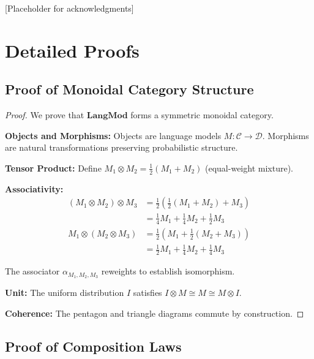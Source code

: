 \documentclass{article}
\theoremstyle{definition}
\begin{document}
[Placeholder for acknowledgments]




\appendix

\section{Detailed Proofs}

\subsection{Proof of Monoidal Category Structure}

\begin{proof}
We prove that $\mathbf{LangMod}$ forms a symmetric monoidal category.

\textbf{Objects and Morphisms:} Objects are language models $M: \mathcal{C} \rightarrow \mathcal{D}$. Morphisms are natural transformations preserving probabilistic structure.

\textbf{Tensor Product:} Define $M_1 \otimes M_2 = \frac{1}{2}(M_1 + M_2)$ (equal-weight mixture).

\textbf{Associativity:}
\begin{align}
(M_1 \otimes M_2) \otimes M_3 &= \frac{1}{2}(\frac{1}{2}(M_1 + M_2) + M_3) \\
&= \frac{1}{4}M_1 + \frac{1}{4}M_2 + \frac{1}{2}M_3 \\
M_1 \otimes (M_2 \otimes M_3) &= \frac{1}{2}(M_1 + \frac{1}{2}(M_2 + M_3)) \\
&= \frac{1}{2}M_1 + \frac{1}{4}M_2 + \frac{1}{4}M_3
\end{align}

The associator $\alpha_{M_1,M_2,M_3}$ reweights to establish isomorphism.

\textbf{Unit:} The uniform distribution $I$ satisfies $I \otimes M \cong M \cong M \otimes I$.

\textbf{Coherence:} The pentagon and triangle diagrams commute by construction.
\end{proof}

\subsection{Proof of Composition Laws}
\end{document}
